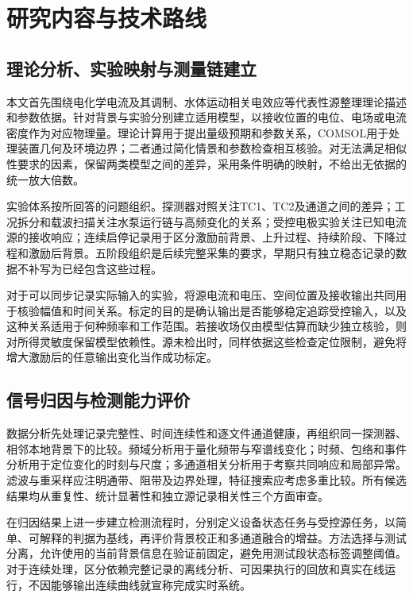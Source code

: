 \section{研究内容与技术路线}

\subsection{理论分析、实验映射与测量链建立}

本文首先围绕电化学电流及其调制、水体运动相关电效应等代表性源整理理论描述和参数依据。针对背景与实验分别建立适用模型，以接收位置的电位、电场或电流密度作为对应物理量。理论计算用于提出量级预期和参数关系，COMSOL用于处理装置几何及环境边界；二者通过简化情景和参数检查相互核验。对无法满足相似性要求的因素，保留两类模型之间的差异，采用条件明确的映射，不给出无依据的统一放大倍数。

实验体系按所回答的问题组织。探测器对照关注TC1、TC2及通道之间的差异；工况拆分和载波扫描关注水泵运行链与高频变化的关系；受控电极实验关注已知电流源的接收响应；连续启停记录用于区分激励前背景、上升过程、持续阶段、下降过程和激励后背景。五阶段组织是后续完整采集的要求，早期只有独立稳态记录的数据不补写为已经包含这些过程。

对于可以同步记录实际输入的实验，将源电流和电压、空间位置及接收输出共同用于核验幅值和时间关系。标定的目的是确认输出是否能够稳定追踪受控输入，以及这种关系适用于何种频率和工作范围。若接收场仅由模型估算而缺少独立核验，则对所得灵敏度保留模型依赖性。源未检出时，同样依据这些检查定位限制，避免将增大激励后的任意输出变化当作成功标定。

\subsection{信号归因与检测能力评价}

数据分析先处理记录完整性、时间连续性和逐文件通道健康，再组织同一探测器、相邻本地背景下的比较。频域分析用于量化频带与窄谱线变化；时频、包络和事件分析用于定位变化的时刻与尺度；多通道相关分析用于考察共同响应和局部异常。滤波与重采样应注明通带、阻带及边界处理，特征搜索应考虑多重比较。所有候选结果均从重复性、统计显著性和独立源记录相关性三个方面审查。

在归因结果上进一步建立检测流程时，分别定义设备状态任务与受控源任务，以简单、可解释的判据为基线，再评价背景校正和多通道融合的增益。方法选择与测试分离，允许使用的当前背景信息在验证前固定，避免用测试段状态标签调整阈值。对于连续处理，区分依赖完整记录的离线分析、可因果执行的回放和真实在线运行，不因能够输出连续曲线就宣称完成实时系统。

